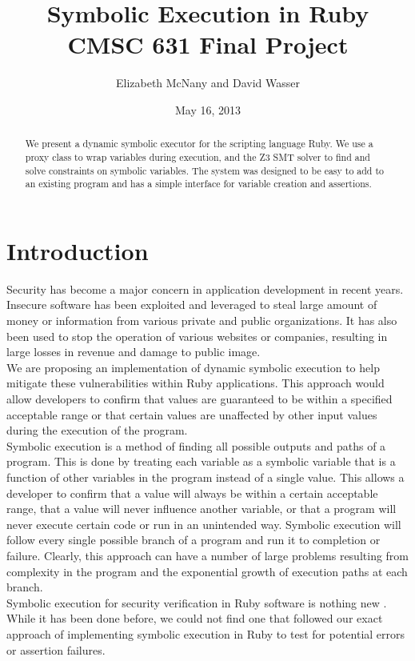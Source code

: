 \documentclass[10pt]{article}
\title{Symbolic Execution in Ruby\\
CMSC 631 Final Project}
\author{Elizabeth McNany and David Wasser}
\date{May 16, 2013}
\begin{document}
\maketitle

\begin{abstract}
We present a dynamic symbolic executor for the scripting language Ruby.  We use a proxy class to wrap variables during execution, and the Z3 SMT solver to find and solve constraints on symbolic variables.  The system was designed to be easy to add to an existing program and has a simple interface for variable creation and assertions.
\end{abstract}

\section{Introduction}
Security has become a major concern in application development in recent years.  Insecure software has been exploited and leveraged to steal large amount of money or information from various private and public organizations.  It has also been used to stop the operation of various websites or companies, resulting in large losses in revenue and damage to public image.\\

We are proposing an implementation of dynamic symbolic execution to help mitigate these vulnerabilities within Ruby applications.  This approach would allow developers to confirm that values are guaranteed to be within a specified acceptable range or that certain values are unaffected by other input values during the execution of the program.\\

Symbolic execution is a method of finding all possible outputs and paths of a program.  This is done by treating each variable as a symbolic variable that is a function of other variables in the program instead of a single value.  This allows a developer to confirm that a value will always be within a certain acceptable range, that a value will never influence another variable, or that a program will never execute certain code or run in an unintended way.  Symbolic execution will follow every single possible branch of a program and run it to completion or failure.  Clearly, this approach can have a number of large problems resulting from complexity in the program and the exponential growth of execution paths at each branch.\\

Symbolic execution for security verification in Ruby software is nothing new \cite{rails}.  While it has been done before, we could not find one that followed our exact approach of implementing symbolic execution in Ruby to test for potential errors or assertion failures.\\
\end{document}
